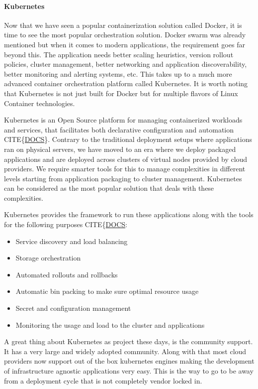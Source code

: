 \documentclass[12pt,titlepage]{article}
\begin{document}
\paragraph{Kubernetes}
\label{sec:org55304cc}
Now that we have seen a popular containerization solution called Docker, it is
time to see the most popular orchestration solution. Docker swarm was already
mentioned but when it comes to modern applications, the requirement goes far
beyond this. The application needs better scaling heuristics, version rollout
policies, cluster management, better networking and application discoverability,
better monitoring and alerting systems, etc. This takes up to a much more
advanced container orchestration platform called Kubernetes. It is worth noting
that Kubernetes is not just built for Docker but for multiple flavors of Linux
Container technologies.

Kubernetes is an Open Source platform for managing containerized workloads and
services, that facilitates both declarative configuration and automation CITE\{\href{https://kubernetes.io/docs/concepts/overview/what-is-kubernetes/}{DOCS}\}.  
Contrary to the traditional deployment setups where applications ran on physical
servers, we have moved to an era where we deploy packaged applications and are
deployed across clusters of virtual nodes provided by cloud providers. We
require smarter tools for this to manage complexities in different levels
starting from application packaging to cluster management. Kubernetes can be
considered as the most popular solution that deals with these complexities.

Kubernetes provides the framework to run these applications along with the tools
for the following purposes CITE\{\href{https://kubernetes.io/docs/concepts/overview/what-is-kubernetes/}{DOCS}:
\begin{itemize}
\item Service discovery and load balancing
\item Storage orchestration
\item Automated rollouts and rollbacks
\item Automatic bin packing to make sure optimal resource usage
\item Secret and configuration management
\item Monitoring the usage and load to the cluster and applications
\end{itemize}

A great thing about Kubernetes as project these days, is the community support.
It has a very large and widely adopted community. Along with that most cloud
providers now support out of the box kubernetes engines making the development
of infrastructure agnostic applications very easy. This is the way to go to be
away from a deployment cycle that is not completely vendor locked in.
\end{document}
